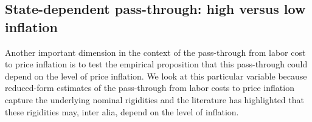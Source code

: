 \documentclass[11pt]{article}
\begin{document}


\subsection{State-dependent pass-through: high versus low inflation}
Another important dimension in the context of the pass-through from labor cost to price inflation is to test the empirical proposition that this pass-through could depend on the level of price inflation. We look at this particular variable because reduced-form estimates of the pass-through from labor costs to price inflation capture the underlying nominal rigidities and the literature has highlighted that these rigidities may, inter alia, depend on the level of inflation. 
\end{document}
